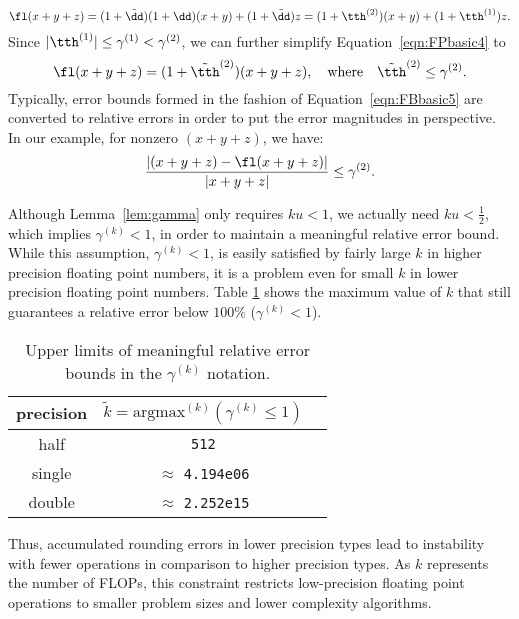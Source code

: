 \begin{equation}
\fl(x+y+z) = (1+\tilde{\dd})(1+\dd) (x+y) + (1+\tilde{\dd})z = (1+\tth^{(2)})(x+y) + (1+\tth^{(1)})z. \label{eqn:FPbasic4}
\end{equation}
Since $|\tth^{(1)}| \leq \gamma^{(1)} < \gamma^{(2)}$, we can further simplify Equation~\ref{eqn:FPbasic4} to
\begin{equation}
\fl(x+y+z) = (1+\tilde{\tth}^{(2)})(x+y+z), \quad \mbox{where} \quad \tilde{\tth}^{(2)} \leq \gamma^{(2)}. \label{eqn:FBbasic5}
\end{equation}
Typically, error bounds formed in the fashion of Equation~\ref{eqn:FBbasic5} are converted to relative errors in order to put the error magnitudes in perspective. 
In our example, for nonzero $(x+y+z)$, we have:
\begin{equation}
\frac{|(x+y+z) - \fl(x+y+z)|}{|x+y+z|} \leq \gamma^{(2)}.
\end{equation}

Although Lemma~\ref{lem:gamma} only requires $ku<1$, we actually need $ku <\frac{1}{2}$, which implies $\gamma^{(k)} <1$, in order to maintain a meaningful relative error bound.
While this assumption, $\gamma^{(k)} < 1$, is easily satisfied by fairly large $k$ in higher precision floating point numbers, it is a problem even for small $k$ in lower precision floating point numbers.
Table \ref{table:ieeen} shows the maximum value of $k$ that still guarantees a relative error below $100\%$ ($\gamma^{(k)} < 1$). 
\begin{table}[h]
	\centering
	\begin{tabular}{||c|c|c||} 
		\hline
		precision &$\tilde{k} = \mathrm{argmax}^{(k)}(\gamma^{(k)} \leq 1)$ \\ \hline
		half & {\tt 512}\\
		single & $\approx$ {\tt 4.194e06} \\ 
		double &  $\approx$ {\tt 2.252e15}\\ \hline 
	\end{tabular}
	\caption{Upper limits of meaningful relative error bounds in the $\gamma^{(k)}$ notation.}
	\label{table:ieeen}
\end{table}
Thus, accumulated rounding errors in lower precision types lead to instability with fewer operations in comparison to higher precision types.
As $k$ represents the number of FLOPs, this constraint restricts low-precision floating point operations to smaller problem sizes and lower complexity algorithms.

